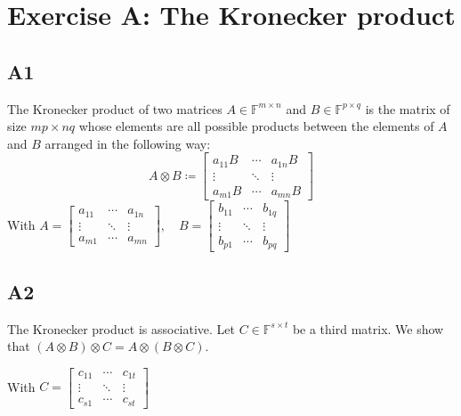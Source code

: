 \documentclass[11pt]{article}
\newcommand{\field}{\mathbb{F}} %
\newcommand{\kp}{\otimes} %
\begin{document}
\section*{Exercise A: The Kronecker product}
\subsection*{A1}
The Kronecker product of two matrices \(A \in \field^{m \times n}\) and \(B \in \field^{p \times q}\) is the matrix of size \(mp \times nq\) whose elements are all possible products between the elements of \(A\) and \(B\) arranged in the following way:
\[
A \kp B \coloneqq \begin{bmatrix}
a_{11} B & \cdots & a_{1n}B \\
\vdots & \ddots & \vdots \\
a_{m1} B & \cdots & a_{mn} B
\end{bmatrix}
\]
 With $A = \begin{bmatrix}a_{11} & \cdots & a_{1n} \\
\vdots & \ddots & \vdots \\
a_{m1} & \cdots & a_{mn}
\end{bmatrix}, \quad B = \begin{bmatrix}b_{11} & \cdots & b_{1q} \\
\vdots & \ddots & \vdots \\
b_{p1} & \cdots & b_{pq}
\end{bmatrix}$

\subsection*{A2}
The Kronecker product is associative.
Let \(C \in \field^{s \times t}\) be a third matrix.
We show that \((A \kp B) \kp C = A \kp (B \kp C)\).

With $C = \begin{bmatrix}c_{11} & \cdots & c_{1t} \\
\vdots & \ddots & \vdots \\
c_{s1} & \cdots & c_{st}
\end{bmatrix}
$
\end{document}
